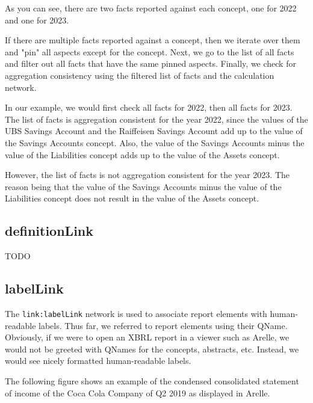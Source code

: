 As you can see, there are two facts reported against each concept, one for 2022 and one for 2023.

If there are multiple facts reported against a concept, then we iterate over them and "pin" all aspects except for the concept.
Next, we go to the list of all facts and filter out all facts that have the same pinned aspects.
Finally, we check for aggregation consistency using the filtered list of facts and the calculation network.

In our example, we would first check all facts for 2022, then all facts for 2023.
The list of facts is aggregation consistent for the year 2022, since the values of the UBS Savings Account and the Raiffeisen Savings Account add up to the value of the Savings Accounts concept.
Also, the value of the Savings Accounts minus the value of the Liabilities concept adds up to the value of the Assets concept.

However, the list of facts is not aggregation consistent for the year 2023.
The reason being that the value of the Savings Accounts minus the value of the Liabilities concept does not result in the value of the Assets concept.

\subsection{definitionLink}
\label{sec:definitionLink}

TODO

\subsection{labelLink}
\label{sec:labelLink}

The \texttt{link:labelLink} network is used to associate report elements with human-readable labels.
Thus far, we referred to report elements using their QName.
Obviously, if we were to open an XBRL report in a viewer such as Arelle, we would not be greeted with QNames for the concepts, abstracts, etc.
Instead, we would see nicely formatted human-readable labels.

The following figure shows an example of the condensed consolidated statement of income of the Coca Cola Company\cite{ko2019q2} of Q2 2019 as displayed in Arelle\cite{arelle}.

